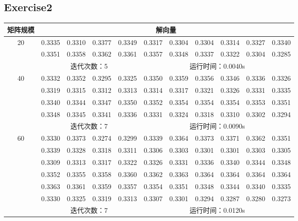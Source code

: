 \documentclass{article}
\begin{document}
\subsection*{Exercise2}

\begin{table}[H]
	\begin{tabular}{|c|cccccccccc|}
		\hline
		矩阵规模                & \multicolumn{10}{c|}{解向量}                                                               \\ \hline
		\multirow{3}{*}{20} & 0.3335 & 0.3310 & 0.3377 & 0.3349 & 0.3317 & 0.3304 & 0.3304 & 0.3314 & 0.3327 & 0.3340 \\
		& 0.3351 & 0.3358 & 0.3362 & 0.3361 & 0.3357 & 0.3348 & 0.3337 & 0.3322 & 0.3304 & 0.3285 \\ \cline{2-11} 
		& \multicolumn{4}{c|}{迭代次数：5}       & \multicolumn{6}{c|}{运行时间：0.0040s}                   \\ \hline
		\multirow{5}{*}{40} & 0.3332 & 0.3352 & 0.3295 & 0.3325 & 0.3350 & 0.3359 & 0.3356 & 0.3346 & 0.3336 & 0.3326 \\
		& 0.3319 & 0.3315 & 0.3312 & 0.3313 & 0.3314 & 0.3317 & 0.3321 & 0.3326 & 0.3331 & 0.3335 \\
		& 0.3340 & 0.3344 & 0.3347 & 0.3350 & 0.3352 & 0.3354 & 0.3354 & 0.3354 & 0.3353 & 0.3351 \\
		& 0.3348 & 0.3345 & 0.3341 & 0.3336 & 0.3331 & 0.3324 & 0.3318 & 0.3310 & 0.3302 & 0.3294 \\ \cline{2-11} 
		& \multicolumn{4}{c|}{迭代次数：7}       & \multicolumn{6}{c|}{运行时间：0.0090s}                   \\ \hline
		\multirow{7}{*}{60} & 0.3330 & 0.3373 & 0.3274 & 0.3299 & 0.3339 & 0.3364 & 0.3373 & 0.3371 & 0.3362 & 0.3351 \\
		& 0.3339 & 0.3328 & 0.3318 & 0.3311 & 0.3306 & 0.3303 & 0.3301 & 0.3301 & 0.3303 & 0.3305 \\
		& 0.3309 & 0.3313 & 0.3317 & 0.3322 & 0.3326 & 0.3331 & 0.3336 & 0.3340 & 0.3344 & 0.3348 \\
		& 0.3352 & 0.3355 & 0.3358 & 0.3360 & 0.3362 & 0.3363 & 0.3364 & 0.3364 & 0.3364 & 0.3364 \\
		& 0.3363 & 0.3361 & 0.3359 & 0.3357 & 0.3354 & 0.3351 & 0.3348 & 0.3344 & 0.3340 & 0.3335 \\
		& 0.3330 & 0.3325 & 0.3319 & 0.3313 & 0.3307 & 0.3301 & 0.3294 & 0.3287 & 0.3280 & 0.3273 \\ \cline{2-11} 
		& \multicolumn{4}{c|}{迭代次数：7}       & \multicolumn{6}{c|}{运行时间：0.0120s}                   \\ \hline

\end{tabular}
\end{table}
\end{document}
